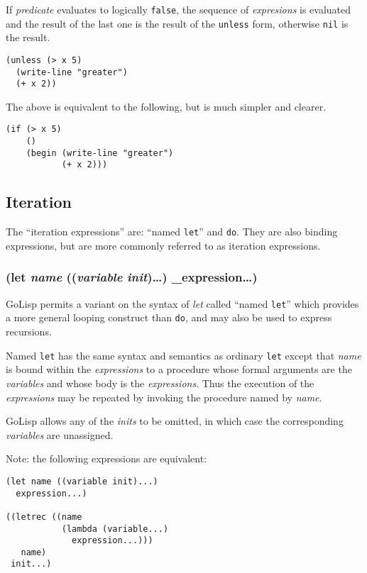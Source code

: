 \documentclass{article}
\begin{document}
If \emph{predicate} evaluates to logically \verb|false|, the sequence of \emph{expresions}
is evaluated and the result of the last one is the result of the \verb|unless| form,
otherwise \verb|nil| is the result.

\begin{verbatim}
(unless (> x 5)
  (write-line "greater")
  (+ x 2))
\end{verbatim}

The above is equivalent to the following, but is much simpler and clearer.

\begin{verbatim}
(if (> x 5)
    ()
    (begin (write-line "greater")
           (+ x 2)))
\end{verbatim}

\subsection{Iteration}\label{sec:iteration}

The ``iteration expressions'' are: ``named \verb|let|'' and \verb|do|. They are also
binding expressions, but are more commonly referred to as iteration expressions.

\subsubsection{(let \emph{name} ((\emph{variable} \emph{init})\ldots{}) \_expression\ldots{})}

GoLisp permits a variant on the syntax of \emph{let} called ``named \verb|let|'' which
provides a more general looping construct than \verb|do|, and may also be used to
express recursions.

Named \verb|let| has the same syntax and semantics as ordinary \verb|let| except that
\emph{name} is bound within the \emph{expressions} to a procedure whose formal arguments are
the \emph{variables} and whose body is the \emph{expressions}. Thus the execution of the
\emph{expressions} may be repeated by invoking the procedure named by \emph{name}.

GoLisp allows any of the \emph{inits} to be omitted, in which case the corresponding
\emph{variables} are unassigned.

Note: the following expressions are equivalent:

\begin{verbatim}
(let name ((variable init)...)
  expression...)

((letrec ((name
           (lambda (variable...)
             expression...)))
   name)
 init...)
\end{verbatim}
\end{document}
